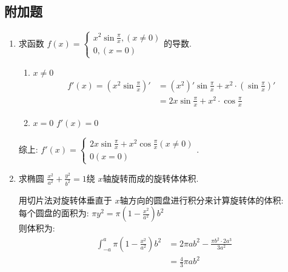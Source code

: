 \begin{questions}
	\section*{附加题}
	\question
	\begin{enumerate}[label=(\arabic*)]
		\item 求函数 \( f(x) = \begin{cases}
			      x^2\sin\frac{\pi}{x}, (x \neq 0) \\
			      0, (x=0)
		      \end{cases} \)的导数.
		      \begin{solution}
			      \begin{enumerate}[label=\arabic*)]
				      \item \( x \neq 0 \)
				            \begin{align*}
					            f'(x) = (x^2\sin\frac{\pi}{x})' & = (x^2)'\sin\frac{\pi}{x} + x^2\cdot(\sin\frac{\pi}{x})' \\
					                                            & = 2x\sin\frac{\pi}{x} + x^2\cdot\cos\frac{\pi}{x}
				            \end{align*}
				      \item \( x = 0 \)
				            \begin{math}
					            f'(x) = 0
				            \end{math}
			      \end{enumerate}
			      综上:
			      \begin{math}
				      f'(x) =
				      \begin{cases}
					      2x\sin\frac{\pi}{x} + x^2\cos\frac{\pi}{x} (x \neq 0) \\
					      0 (x = 0)
				      \end{cases}.
			      \end{math}
		      \end{solution}

		\item 求椭圆 \( \frac{x^2}{a^2} + \frac{y^2}{b^2} = 1 \)绕 $x$轴旋转而成的旋转体体积.
		      \begin{solution}
			      用切片法对旋转体垂直于 \( x \)轴方向的圆盘进行积分来计算旋转体的体积:\\
			      每个圆盘的面积为: \( \pi y^2 = \pi (1-\frac{x^2}{a^2})b^2 \) \\
			      则体积为:
			      \begin{align*}
				      \int_{-a}^{a}\pi(1-\frac{x^2}{a^2})b^2 & = 2\pi ab^2 - \frac{\pi b^2\cdot 2a^3}{3a^2} \\
				                                             & = \frac{4}{3}\pi ab^2
			      \end{align*}


\end{solution}
\end{enumerate}
\end{questions}
